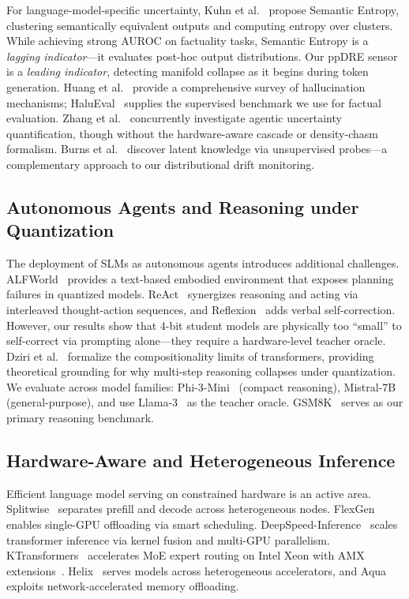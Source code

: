 \documentclass{uai2026}  %
\begin{document}
For language-model-specific uncertainty,
Kuhn et al.~\cite{kuhn2023semantic} propose Semantic Entropy,
clustering semantically equivalent outputs and computing entropy over clusters.
While achieving strong AUROC on factuality tasks,
Semantic Entropy is a \emph{lagging indicator}---it evaluates post-hoc output distributions.
Our ppDRE sensor is a \emph{leading indicator}, detecting manifold collapse
as it begins during token generation.
Huang et al.~\cite{huang2024hallucination} provide a comprehensive survey of
hallucination mechanisms; HaluEval~\cite{li2023halueval} supplies the supervised benchmark
we use for factual evaluation.
Zhang et al.~\cite{zhang2025agentic} concurrently investigate agentic uncertainty quantification,
though without the hardware-aware cascade or density-chasm formalism.
Burns et al.~\cite{burns2023discovering} discover latent knowledge via unsupervised probes---a
complementary approach to our distributional drift monitoring.

\subsection{Autonomous Agents and Reasoning under Quantization}

The deployment of SLMs as autonomous agents introduces additional challenges.
ALFWorld~\cite{shridhar2021alfworld} provides a text-based embodied environment
that exposes planning failures in quantized models.
ReAct~\cite{yao2023react} synergizes reasoning and acting via interleaved thought-action
sequences, and Reflexion~\cite{shinn2024reflexion} adds verbal self-correction.
However, our results show that 4-bit student models are physically too
``small'' to self-correct via prompting alone---they require a hardware-level
teacher oracle.
Dziri et al.~\cite{dziri2023faith} formalize the compositionality limits
of transformers, providing theoretical grounding for why multi-step reasoning
collapses under quantization.
We evaluate across model families:
Phi-3-Mini~\cite{abdin2024phi3} (compact reasoning),
Mistral-7B~\cite{jiang2023mistral} (general-purpose),
and use Llama-3~\cite{dubey2024llama3} as the teacher oracle.
GSM8K~\cite{cobbe2021gsm8k} serves as our primary reasoning benchmark.

\subsection{Hardware-Aware and Heterogeneous Inference}

Efficient language model serving on constrained hardware is an active area.
Splitwise~\cite{patel2024splitwise} separates prefill and decode across heterogeneous nodes.
FlexGen~\cite{sheng2023flexgen} enables single-GPU offloading via smart scheduling.
DeepSpeed-Inference~\cite{aminabadi2022deepspeed} scales transformer inference
via kernel fusion and multi-GPU parallelism.
KTransformers~\cite{sosp2025ktransformers} accelerates MoE expert routing
on Intel Xeon with AMX extensions~\cite{intel2023amx}.
Helix~\cite{patel2025helix} serves models across heterogeneous accelerators,
and Aqua~\cite{vijayakumar2025aqua} exploits network-accelerated memory offloading.
\end{document}
